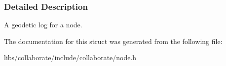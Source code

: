 \subsubsection{Detailed Description}
A geodetic log for a node. 

The documentation for this struct was generated from the following file\+:\begin{DoxyCompactItemize}
\item 
libs/collaborate/include/collaborate/node.\+h\end{DoxyCompactItemize}
